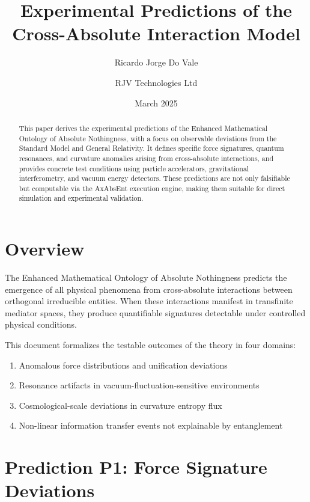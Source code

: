 \documentclass[11pt]{article}
\title{\textbf{Experimental Predictions of the Cross-Absolute Interaction Model}}
\author[1]{Ricardo Jorge Do Vale}
\author[1]{RJV Technologies Ltd}
\date{March 2025}
\begin{document}
\maketitle

\begin{abstract}
This paper derives the experimental predictions of the Enhanced Mathematical Ontology of Absolute Nothingness, with a focus on observable deviations from the Standard Model and General Relativity. It defines specific force signatures, quantum resonances, and curvature anomalies arising from cross-absolute interactions, and provides concrete test conditions using particle accelerators, gravitational interferometry, and vacuum energy detectors. These predictions are not only falsifiable but computable via the AxAbsEnt execution engine, making them suitable for direct simulation and experimental validation.
\end{abstract}

\tableofcontents

\newpage

\section{Overview}

The Enhanced Mathematical Ontology of Absolute Nothingness predicts the emergence of all physical phenomena from cross-absolute interactions between orthogonal irreducible entities. When these interactions manifest in transfinite mediator spaces, they produce quantifiable signatures detectable under controlled physical conditions.

This document formalizes the testable outcomes of the theory in four domains:

\begin{enumerate}[label=\textbf{P\arabic*}]
    \item Anomalous force distributions and unification deviations
    \item Resonance artifacts in vacuum-fluctuation-sensitive environments
    \item Cosmological-scale deviations in curvature entropy flux
    \item Non-linear information transfer events not explainable by entanglement
\end{enumerate}

\section{Prediction P1: Force Signature Deviations}
\end{document}
